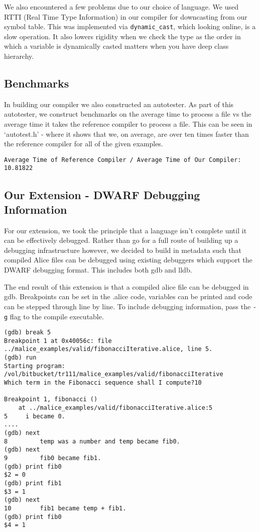 \documentclass[a4wide, 11pt]{article}
\begin{document}
We also encountered a few problems due to our choice of language. We used RTTI (Real Time Type Information) in our compiler for downcasting from our symbol table. This was implemented via \texttt{dynamic\_cast}, which looking online, is a slow operation. It also lowers rigidity when we check the type as the order in which a variable is dynamically casted matters when you have deep class hierarchy.

\subsection{Benchmarks}

In building our compiler we also constructed an autotester. As part of this autotester, we construct benchmarks on the average time to process a file vs the average time it takes the reference compiler to process a file. This can be seen in `autotest.h' - where it shows that we, on average, are over ten times faster than the reference compiler for all of the given examples.
\begin{verbatim}
Average Time of Reference Compiler / Average Time of Our Compiler: 10.81822
\end{verbatim}

\subsection{Our Extension - DWARF Debugging Information}

For our extension, we took the principle that a language isn't complete until it can be effectively debugged. Rather than go for a full route of building up a debugging infrastructure however, we decided to build in metadata such that compiled Alice files can be debugged using existing debuggers which support the DWARF debugging format. This includes both gdb and lldb.

The end result of this extension is that a compiled alice file can be debugged in gdb. Breakpoints can be set in the .alice code, variables can be printed and code can be stepped through line by line. To include debugging information, pass the \texttt{-g} flag to the compile executable.

\begin{verbatim}
(gdb) break 5
Breakpoint 1 at 0x40056c: file ../malice_examples/valid/fibonacciIterative.alice, line 5.
(gdb) run
Starting program: /vol/bitbucket/tr111/malice_examples/valid/fibonacciIterative 
Which term in the Fibonacci sequence shall I compute?10

Breakpoint 1, fibonacci ()
    at ../malice_examples/valid/fibonacciIterative.alice:5
5     i became 0.
....
(gdb) next
8         temp was a number and temp became fib0.
(gdb) next
9         fib0 became fib1.
(gdb) print fib0
$2 = 0
(gdb) print fib1
$3 = 1
(gdb) next
10        fib1 became temp + fib1.
(gdb) print fib0
$4 = 1
\end{verbatim}
\end{document}
